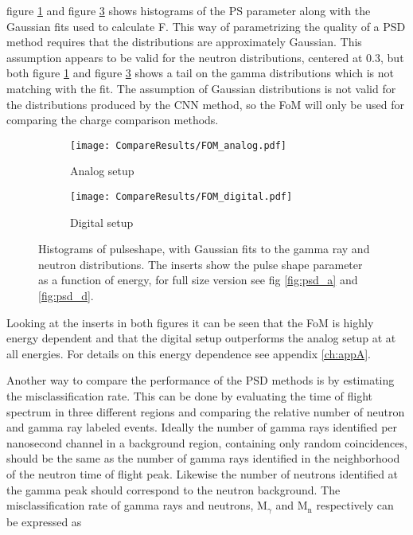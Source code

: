 \documentclass[main.tex]{subfiles}
\begin{document}
figure \ref{fig:fom_analog} and figure \ref{fig:fom_digital} shows histograms of the PS parameter along with the Gaussian fits used to calculate F. This way of parametrizing the quality of a PSD method requires that the distributions are approximately Gaussian. This assumption appears to be valid for the neutron distributions, centered at 0.3, but both figure \ref{fig:fom_analog} and figure \ref{fig:fom_digital} shows a tail on the gamma distributions which is not matching with the fit. The assumption of Gaussian distributions is not valid for the distributions produced by the CNN method, so the FoM will only be used for comparing the charge comparison methods. 


\begin{figure}[h]
	\begin{subfigure}[b]{\textwidth}
	    \centering
    	    \texttt{[image: CompareResults/FOM\_analog.pdf]}
        	\caption{Analog setup}
	    \label{fig:fom_analog} 
	\end{subfigure}
	\begin{subfigure}[b]{\textwidth}
    	\centering
        	\texttt{[image: CompareResults/FOM\_digital.pdf]}
        	\caption{Digital setup}
    	\label{fig:fom_digital} 
    \end{subfigure}
    \caption[Histograms of pulseshape, with Gaussian fits.]{Histograms of pulseshape, with Gaussian fits to the gamma ray and neutron distributions. The inserts show the pulse shape parameter as a function of energy, for full size version see fig \ref{fig:psd_a} and \ref{fig:psd_d}. }
\end{figure}

Looking at the inserts in both figures it can be seen that the FoM is highly energy dependent and that the digital setup outperforms the analog setup at at all energies. For details on this energy dependence see appendix \ref{ch:appA}. 

Another way to compare the performance of the PSD methods is by estimating the misclassification rate. This can be done by evaluating the time of flight spectrum in three different regions and comparing the relative number of neutron and gamma ray labeled events. Ideally the number of gamma rays identified per nanosecond channel in a background region, containing only random coincidences, should be the same as the number of gamma rays identified in the neighborhood of the neutron time of flight peak. Likewise the number of neutrons identified at the gamma peak should correspond to the neutron background. The misclassification rate of gamma rays and neutrons, 
M$_{\gamma}$ and M$_\textrm{n}$ respectively can be expressed as
\end{document}
